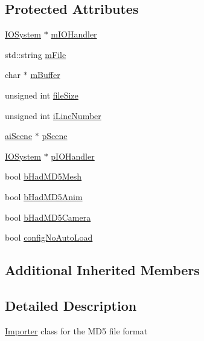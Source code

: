 \subsection*{Protected Attributes}
\begin{DoxyCompactItemize}
\item 
\hyperlink{class_assimp_1_1_i_o_system}{I\+O\+System} $\ast$ \hyperlink{class_assimp_1_1_m_d5_importer_ae4fe137342a0fccd002c6a36bea21ba5}{m\+I\+O\+Handler}
\item 
std\+::string \hyperlink{class_assimp_1_1_m_d5_importer_ae0550e0a1905777d59081f3ca67cf59f}{m\+File}
\item 
char $\ast$ \hyperlink{class_assimp_1_1_m_d5_importer_aaeef47328bed97291af1d494edd941ce}{m\+Buffer}
\item 
unsigned int \hyperlink{class_assimp_1_1_m_d5_importer_aea09531401b7e32735dfb6ed0af09301}{file\+Size}
\item 
unsigned int \hyperlink{class_assimp_1_1_m_d5_importer_a40a2bad49954cec75bb4126c2de08f19}{i\+Line\+Number}
\item 
\hyperlink{structai_scene}{ai\+Scene} $\ast$ \hyperlink{class_assimp_1_1_m_d5_importer_a0b840bcb30b376c7cb45557dcc84d3b0}{p\+Scene}
\item 
\hyperlink{class_assimp_1_1_i_o_system}{I\+O\+System} $\ast$ \hyperlink{class_assimp_1_1_m_d5_importer_ad47907df2a104a4130b56b728ccec5ab}{p\+I\+O\+Handler}
\item 
bool \hyperlink{class_assimp_1_1_m_d5_importer_a846f72291cf0405d2706ddd760c6cd50}{b\+Had\+M\+D5\+Mesh}
\item 
bool \hyperlink{class_assimp_1_1_m_d5_importer_a15d640ebdbd30f65a78ed04a25da64a0}{b\+Had\+M\+D5\+Anim}
\item 
bool \hyperlink{class_assimp_1_1_m_d5_importer_afd03d113a5cff8de28877ebf2afd244c}{b\+Had\+M\+D5\+Camera}
\item 
bool \hyperlink{class_assimp_1_1_m_d5_importer_a6f654966c66b6542291ef4ad26be1592}{config\+No\+Auto\+Load}
\end{DoxyCompactItemize}
\subsection*{Additional Inherited Members}


\subsection{Detailed Description}
\hyperlink{class_assimp_1_1_importer}{Importer} class for the M\+D5 file format 

